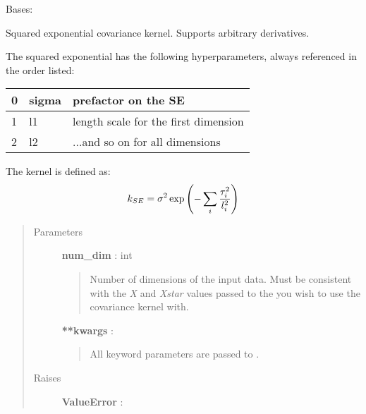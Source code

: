 \documentclass[letterpaper,10pt,english]{sphinxmanual}
\begin{document}
\begin{fulllineitems}
\label{gptools.kernel:gptools.kernel.squared_exponential.SquaredExponentialKernel}
Bases: {\hyperref[gptools.kernel:gptools.kernel.core.Kernel]{}}

Squared exponential covariance kernel. Supports arbitrary derivatives.

The squared exponential has the following hyperparameters, always
referenced in the order listed:

\begin{tabulary}{\linewidth}{|L|L|L|}
\hline

0
 & 
sigma
 & 
prefactor on the SE
\\\hline

1
 & 
l1
 & 
length scale for the first dimension
\\\hline

2
 & 
l2
 & 
...and so on for all dimensions
\\\hline
\end{tabulary}


The kernel is defined as:
\begin{gather}
\begin{split}k_{SE} = \sigma^2 \exp\left(-\sum_i\frac{\tau_i^2}{l_i^2}\right)\end{split}\notag
\end{gather}\begin{quote}\begin{description}
\item[{Parameters }] \leavevmode
\textbf{num\_dim} : int
\begin{quote}

Number of dimensions of the input data. Must be consistent
with the \emph{X} and \emph{Xstar} values passed to the
{\hyperref[gptools:gptools.gaussian_process.GaussianProcess]{}} you
wish to use the covariance kernel with.
\end{quote}

\textbf{**kwargs} :
\begin{quote}

All keyword parameters are passed to {\hyperref[gptools.kernel:gptools.kernel.core.Kernel]{}}.
\end{quote}

\item[{Raises }] \leavevmode
\textbf{ValueError} :
\begin{quote}


\end{quote}
\end{description}
\end{quote}
\end{fulllineitems}
\end{document}
